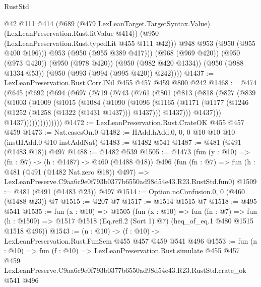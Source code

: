 \begin{lexlean}{RustStd}
\begin{coremodule}
              @42
              @111
              @414
              (@689
                (@479 LexLeanTarget.TargetSyntax.Value)
                (LexLeanPreservation.Rust.litValue @414))
              (@950 (LexLeanPreservation.Rust.typedLit @455 @111 @42)))
            @948
            @953
            (@950 (@955 @400 @196)))
          @953
          (@950 (@955 @389 @417)))
        (@968 (@969 @420))
        (@950 (@973 @420))
        (@950 (@978 @420))
        (@950 (@982 @420 @1334))
        (@950 (@988 @1334 @53))
        (@950 (@993 (@994 (@995 @420)) @242))))
@1437 := LexLeanPreservation.Rust.Corr.lNil @455 @457 @459 @800 @242
@1468 := @474
    (@645
      (@692
        (@694
          (@697
            (@719
              (@743
                (@761
                  (@801
                    (@813
                      (@818
                        (@827
                          (@839
                            (@1003
                              (@1009
                                (@1015
                                  (@1084
                                    (@1090
                                      (@1096
                                        (@1165
                                          (@1171
                                            (@1177
                                              (@1246 (@1252 (@1258 (@1322 (@1431 @1437))) @1437)))
                                            @1437)))
                                      @1437)))
                                @1437))))))))))))))
@1472 := LexLeanPreservation.Rust.CrateOK @455 @457 @459
@1473 := Nat.casesOn.{0}
@1482 := HAdd.hAdd.{0, 0, 0} @10 @10 @10 (instHAdd.{0} @10 instAddNat)
@1483 := @1482 @541
@1487 := @481 (@491 (@1483 @18)) @497
@1488 := @1482 @539
@1505 := @1473
    (fun (y : @10) => (fn : @7) -> (h : @1487) -> @460 (@1488 @18))
    @496
    (fun (fn : @7) =>
    fun (h : @481 (@491 (@1482 Nat.zero @18)) @497) =>
    LexLeanPreserve.C9aa6c9e0f793b0377b6550ad98d54e43.R23.RustStd.fun0)
@1509 := @481 (@491 (@1483 @23)) @497
@1514 := Option.noConfusion.{0, 0} (@460 (@1488 @23)) @7
@1515 := @207 @7
@1517 := @1514 @1515 @7
@1518 := @495 @541
@1535 := fun (x : @10) =>
  @1505
    (fun (x : @10) =>
    fun (fn : @7) =>
    fun (h : @1509) => @1517 @1518 (Eq.refl.{2} (Sort 1) @7) (heq_of_eq.{1} @480 @1515 @1518 @496))
@1543 := (n : @10) -> (f : @10) -> LexLeanPreservation.Rust.FunSem @455 @457 @459 @541 @496
@1553 := fun (n : @10) =>
  fun (f : @10) =>
  LexLeanPreservation.Rust.simulate
    @455
    @457
    @459
    LexLeanPreserve.C9aa6c9e0f793b0377b6550ad98d54e43.R23.RustStd.crate_ok
    @541
    @496
\end{coremodule}
\end{lexlean}
